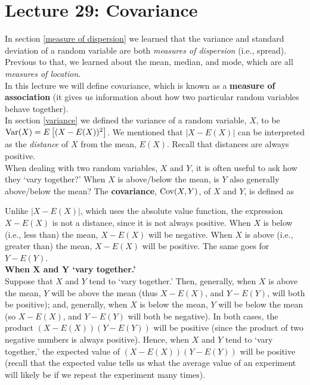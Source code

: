 \chapter{Lecture 29: Covariance} \label{cov(X,Y)} \label{covariance} \label{measure of association}
In section \ref{measure of dispersion} we learned that the variance and standard deviation of a random variable are both \textit{measures of dispersion} (i.e., spread). Previous to that, we learned about the mean, median, and mode, which are all \textit{measures of location}.  \\

\noindent In this lecture we will define covariance, which is known as a \textbf{measure of association} (it gives us information about how two particular random variables behave together). \\

\noindent In section \ref{variance} we defined the variance of a random variable, $X$, to be $\text{Var}(X) = E\left[(X - E(X))^2\right]$. We mentioned that $|X - E(X)|$ can be interpreted as the \textit{distance} of $X$ from the mean, $E(X)$. Recall that distances are always positive. \\

\noindent When dealing with two random variables, $X$ and $Y$, it is often useful to ask how they `vary together?' When $X$ is above/below the mean, is $Y$ also generally above/below the mean? The \textbf{covariance}, $\text{Cov}(X,Y)$, of $X$ and $Y$, is defined as

  	\bigskip
	
	\hfil{}
	\bigskip
	\bigskip

\noindent Unlike $|X - E(X)|$, which uses the absolute value function, the expression $X - E(X)$ is not a distance, since it is not always positive. When $X$ is below (i.e., less than) the mean, $X - E(X)$ will be negative. When $X$ is above (i.e., greater than) the mean, $X - E(X)$ will be positive. The same goes for $Y - E(Y)$. \\

\noindent \textbf{When $\boldsymbol{X}$ and $\boldsymbol{Y}$ `vary together.'} \\
\noindent Suppose that $X$ and $Y$ tend to `vary together.' Then, generally, when $X$ is above the mean, $Y$ will be above the mean (thus $X - E(X)$, and $Y - E(Y)$, will both be positive); and, generally, when $X$ is below the mean, $Y$ will be below the mean (so $X - E(X)$, and $Y - E(Y)$ will both be negative). In both cases, the product $(X - E(X))(Y - E(Y))$ will be positive (since the product of two negative numbers is always positive). Hence, when $X$ and $Y$ tend to `vary together,' the expected value of $(X - E(X))(Y - E(Y))$ will be positive (recall that the expected value tells us what the average value of an experiment will likely be if we repeat the experiment many times). \\

